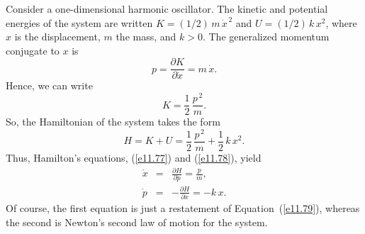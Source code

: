 Consider a one-dimensional harmonic oscillator. The kinetic and potential
energies of the system are written $K = (1/2)\,m\,\dot{x}^{\,2}$ and
$U=(1/2)\,k\,x^2$, where $x$ is the displacement, $m$ the mass, and $k>0$. 
The generalized momentum conjugate to $x$ is
\begin{equation}\label{e11.79}
p = \frac{\partial K}{\partial\dot{x}} = m\,\dot{x}.
\end{equation}
Hence, we can write
\begin{equation}
K = \frac{1}{2}\,\frac{p^{\,2}}{m}.
\end{equation}
So, the Hamiltonian of the system takes the form
\begin{equation}
H = K + U = \frac{1}{2}\,\frac{p^{\,2}}{m} + \frac{1}{2}\,k\,x^2.
\end{equation}
Thus, Hamilton's equations, (\ref{e11.77}) and (\ref{e11.78}), yield
\begin{eqnarray}
\dot{x} &=& \frac{\partial H}{\partial p} = \frac{p}{m},\\[0.5ex]
\dot{p} &=& - \frac{\partial H}{\partial x} = - k\,x.
\end{eqnarray}
Of course, the first equation is just a restatement of Equation~(\ref{e11.79}), whereas the second is Newton's second law of motion for the
system.

